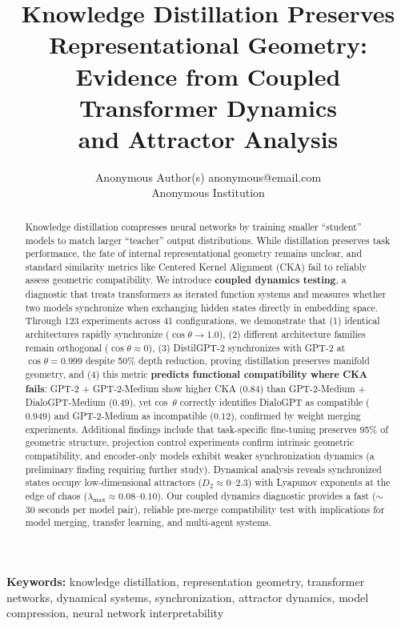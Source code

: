 \documentclass[10pt]{article} %
\title{Knowledge Distillation Preserves Representational Geometry:\\ Evidence from Coupled Transformer Dynamics\\ and Attractor Analysis}
\author{\name Anonymous Author(s) \email anonymous@email.com \\
      \addr Anonymous Institution}
\theoremstyle{plain}
\theoremstyle{definition}
\theoremstyle{remark}
\begin{document}
\maketitle

\begin{abstract}
Knowledge distillation compresses neural networks by training smaller ``student'' models to match larger ``teacher'' output distributions. While distillation preserves task performance, the fate of internal representational geometry remains unclear, and standard similarity metrics like Centered Kernel Alignment (CKA) fail to reliably assess geometric compatibility. We introduce \textbf{coupled dynamics testing}, a diagnostic that treats transformers as iterated function systems and measures whether two models synchronize when exchanging hidden states directly in embedding space. Through 123 experiments across 41 configurations, we demonstrate that (1) identical architectures rapidly synchronize ($\cos \theta \to 1.0$), (2) different architecture families remain orthogonal ($\cos \theta \approx 0$), (3) DistilGPT-2 synchronizes with GPT-2 at $\cos \theta = 0.999$ despite 50\% depth reduction, proving distillation preserves manifold geometry, and (4) this metric \textbf{predicts functional compatibility where CKA fails}: GPT-2 + GPT-2-Medium show higher CKA ($0.84$) than GPT-2-Medium + DialoGPT-Medium ($0.49$), yet cos~$\theta$ correctly identifies DialoGPT as compatible ($0.949$) and GPT-2-Medium as incompatible ($0.12$), confirmed by weight merging experiments. Additional findings include that task-specific fine-tuning preserves 95\% of geometric structure, projection control experiments confirm intrinsic geometric compatibility, and encoder-only models exhibit weaker synchronization dynamics (a preliminary finding requiring further study). Dynamical analysis reveals synchronized states occupy low-dimensional attractors ($D_2 \approx 0$--$2.3$) with Lyapunov exponents at the edge of chaos ($\lambda_{\max} \approx 0.08$--$0.10$). Our coupled dynamics diagnostic provides a fast ($\sim$30 seconds per model pair), reliable pre-merge compatibility test with implications for model merging, transfer learning, and multi-agent systems.
\end{abstract}


\textbf{Keywords:} knowledge distillation, representation geometry, transformer networks, dynamical systems, synchronization, attractor dynamics, model compression, neural network interpretability
\end{document}
